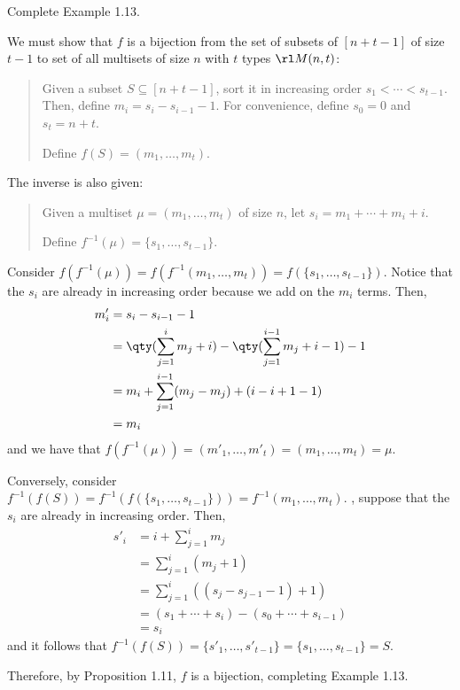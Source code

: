 \begin{xca}
  Complete Example 1.13.
\end{xca}
\begin{prf}
  We must show that $f$ is a bijection from
  the set of subsets of $[n+t-1]$ of size $t-1$
  to set of all multisets of size $n$ with $t$ types $\rl M(n,t)$:
  \begin{quote}
    Given a subset $S \subseteq [n+t-1]$,
    sort it in increasing order $s_1 < \dotsb < s_{t-1}$.
    Then, define $m_i = s_i - s_{i-1} - 1$.
    For convenience, define $s_0 = 0$ and $s_t = n+t$.

    Define $f(S) = (m_1,\dotsc,m_t)$.
  \end{quote}
  The inverse is also given:
  \begin{quote}
    Given a multiset $\mu = (m_1,\dotsc,m_t)$ of size $n$,
    let $s_i = m_1 + \dotsb + m_i + i$.

    Define $f^{-1}(\mu) = \{s_1,\dotsc,s_{t-1}\}$.
  \end{quote}
  Consider $f(f^{-1}(\mu)) = f(f^{-1}(m_1,\dotsc,m_t)) = f(\{s_1,\dotsc,s_{t-1}\})$.
  Notice that the $s_i$ are already in increasing order
  because we add on the $m_i$ terms. Then,
  \begin{align*}
    m'_i & = s_i - s_{i-1} - 1                                                 \\
         & = \qty(\sum_{j=1}^i m_j + i) - \qty(\sum_{j=1}^{i-1} m_j + i-1) - 1 \\
         & = m_i + \sum_{j=1}^{i-1}(m_j - m_j) + (i - i + 1 - 1)               \\
         & = m_i
  \end{align*}
  and we have that $f(f^{-1}(\mu)) = (m'_1,\dotsc,m'_t) = (m_1,\dotsc,m_t) = \mu$.

  Conversely, consider $f^{-1}(f(S)) = f^{-1}(f(\{s_1,\dotsc,s_{t-1}\})) = f^{-1}(m_1,\dotsc,m_t)$.
  \WLOG, suppose that the $s_i$ are already in increasing order. Then,
  \begin{align*}
    s'_i & = i + \sum_{j=1}^i m_j                            \\
         & = \sum_{j=1}^i (m_j + 1)                          \\
         & = \sum_{j=1}^i ((s_j - s_{j-1} - 1) + 1)          \\
         & = (s_1 + \dotsb + s_i) - (s_0 + \dotsb + s_{i-1}) \\
         & = s_i
  \end{align*}
  and it follows that $f^{-1}(f(S)) = \{s'_1,\dotsc,s'_{t-1}\} = \{s_1,\dotsc,s_{t-1}\} = S$.

  Therefore, by Proposition 1.11, $f$ is a bijection, completing Example 1.13.
\end{prf}

